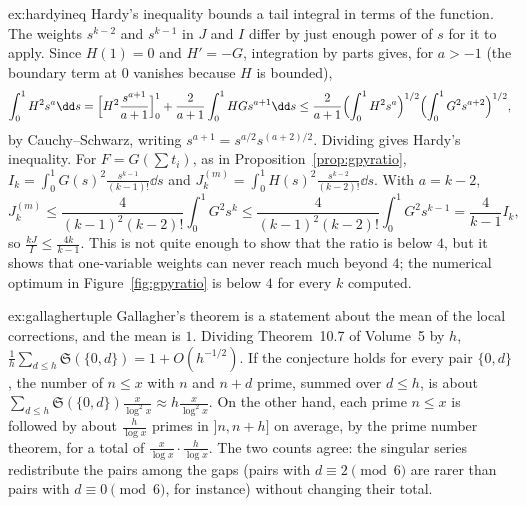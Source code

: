 \begin{solution}{ex:hardyineq}
\idea Hardy's inequality bounds a tail integral in terms of the function. The weights $s^{k-2}$ and $s^{k-1}$ in $J$ and $I$ differ by just enough power of $s$ for it to apply.
\writeup Since $H(1)=0$ and $H'=-G$, integration by parts gives, for $a>-1$ (the boundary term at $0$ vanishes because $H$ is bounded),
\[
\int_0^1H^2s^a\dd s=\Bigl[H^2\frac{s^{a+1}}{a+1}\Bigr]_0^1+\frac2{a+1}\int_0^1HGs^{a+1}\dd s\le\frac2{a+1}\Bigl(\int_0^1H^2s^a\Bigr)^{1/2}\Bigl(\int_0^1G^2s^{a+2}\Bigr)^{1/2},
\]
by Cauchy--Schwarz, writing $s^{a+1}=s^{a/2}s^{(a+2)/2}$. Dividing gives Hardy's inequality. For $F=G(\sum t_i)$, as in Proposition~\ref{prop:gpyratio}, $I_k=\int_0^1G(s)^2\frac{s^{k-1}}{(k-1)!}\dd s$ and $J_k^{(m)}=\int_0^1H(s)^2\frac{s^{k-2}}{(k-2)!}\dd s$. With $a=k-2$,
\[
J_k^{(m)}\le\frac4{(k-1)^2(k-2)!}\int_0^1G^2s^k\le\frac4{(k-1)^2(k-2)!}\int_0^1G^2s^{k-1}=\frac{4}{k-1}I_k,
\]
so $\frac{kJ}I\le\frac{4k}{k-1}$. This is not quite enough to show that the ratio is below $4$, but it shows that one-variable weights can never reach much beyond $4$; the numerical optimum in Figure~\ref{fig:gpyratio} is below $4$ for every $k$ computed.
\end{solution}

\begin{solution}{ex:gallaghertuple}
\idea Gallagher's theorem is a statement about the mean of the local corrections, and the mean is $1$.
\writeup Dividing Theorem~10.7 of Volume~5 by $h$, $\frac1h\sum_{d\le h}\mathfrak S(\{0,d\})=1+O(h^{-1/2})$. If the conjecture holds for every pair $\{0,d\}$, the number of $n\le x$ with $n$ and $n+d$ prime, summed over $d\le h$, is about $\sum_{d\le h}\mathfrak S(\{0,d\})\frac x{\log^2x}\approx h\frac x{\log^2x}$. On the other hand, each prime $n\le x$ is followed by about $\frac h{\log x}$ primes in $]n,n+h]$ on average, by the prime number theorem, for a total of $\frac x{\log x}\cdot\frac h{\log x}$. The two counts agree: the singular series redistribute the pairs among the gaps (pairs with $d\equiv2\pmod 6$ are rarer than pairs with $d\equiv0\pmod6$, for instance) without changing their total.
\end{solution}

